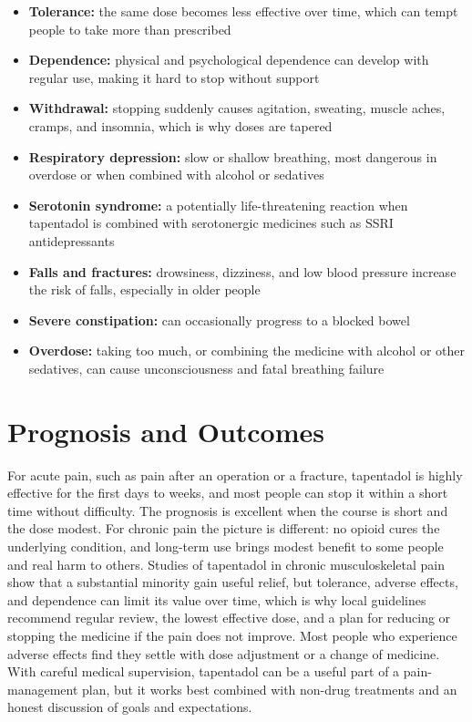 \begin{itemize}
    \item \textbf{Tolerance:} the same dose becomes less effective over time, which can tempt people to take more than prescribed
    \item \textbf{Dependence:} physical and psychological dependence can develop with regular use, making it hard to stop without support
    \item \textbf{Withdrawal:} stopping suddenly causes agitation, sweating, muscle aches, cramps, and insomnia, which is why doses are tapered
    \item \textbf{Respiratory depression:} slow or shallow breathing, most dangerous in overdose or when combined with alcohol or sedatives
    \item \textbf{Serotonin syndrome:} a potentially life-threatening reaction when tapentadol is combined with serotonergic medicines such as SSRI antidepressants
    \item \textbf{Falls and fractures:} drowsiness, dizziness, and low blood pressure increase the risk of falls, especially in older people
    \item \textbf{Severe constipation:} can occasionally progress to a blocked bowel
    \item \textbf{Overdose:} taking too much, or combining the medicine with alcohol or other sedatives, can cause unconsciousness and fatal breathing failure
\end{itemize}

\section*{Prognosis and Outcomes}
For acute pain, such as pain after an operation or a fracture, tapentadol is highly effective for the first days to weeks, and most people can stop it within a short time without difficulty. The prognosis is excellent when the course is short and the dose modest. For chronic pain the picture is different: no opioid cures the underlying condition, and long-term use brings modest benefit to some people and real harm to others. Studies of tapentadol in chronic musculoskeletal pain show that a substantial minority gain useful relief, but tolerance, adverse effects, and dependence can limit its value over time, which is why local guidelines recommend regular review, the lowest effective dose, and a plan for reducing or stopping the medicine if the pain does not improve. Most people who experience adverse effects find they settle with dose adjustment or a change of medicine. With careful medical supervision, tapentadol can be a useful part of a pain-management plan, but it works best combined with non-drug treatments and an honest discussion of goals and expectations.

